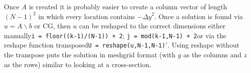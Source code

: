 \documentclass[10pt]{article}
\begin{document}
	Once $ A $ is created it is probably easier to create a column vector of length $ (N-1)^2 $ in which every location contains $ -{\Delta y}^2 $. Once a solution is found via $ u = A\backslash b $ or CG, then $ u $ can be reshaped to the correct dimensions either manually\textemdash \texttt{i = floor((k-1)/(N-1)) + 2}; \texttt{j = mod(k-1,N-1) + 2}\textemdash or via the reshape function transposed\textemdash \texttt{U = reshape(u,N-1,N-1)$'$}. Using reshape without the transpose puts the solution in meshgrid format (with $ y $ as the columns and $ z $ as the rows) similar to looking at a cross-section.
	
\end{document}
